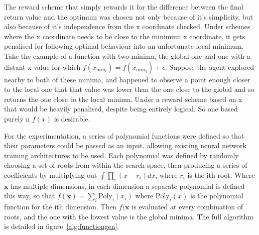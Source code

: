 The reward scheme that simply rewards it for the difference between the final return value and the optimum was chosen not only because of it's simplicity, but also because of it's independence from the x coordinate checked. Under schemes where the x coordinate needs to be close to the minimum x coordinate, it gets penalised for following optimal behaviour into an unfortunate local minimum. Take the example of a function with two minima, the global one and one with a distant x value for which $f(x_{min_l}) = f(x_{min_g}) + \epsilon$. Suppose the agent explored nearby to both of these minima, and happened to observe a point enough closer to the local one that that value was lower than the one close to the global and so returns the one close to the local minima. Under a reward scheme based on x that would be heavily penalised, despite being entirely logical. So one based  purely n $f(x)$ is desirable.

For the experimentation, a series of polynomial functions were defined so that their parameters could be passed as an input, allowing existing neural network training architectures to be used. Each polynomial was defined by randomly choosing a set of roots from within the search space, then producing a series of coefficients by multiplying out
$\int \prod_i (x - r_i) dx$, where $r_i$ is the ith root. Where $\boldsymbol{x}$ has multiple dimensions, in each dimension a separate polynomial is defined this way, so that $f(\boldsymbol{x})  = \sum_i \text{Poly}_i(x_i)$ where $\text{Poly}_i(x)$ is the polynomial function for the ith dimension. Then $f(\boldsymbol{x}$ is evaluated at every combination of roots, and the one with the lowest value is the global minima. The full algorithm is detailed in figure~\ref{alg:functiongen}.

